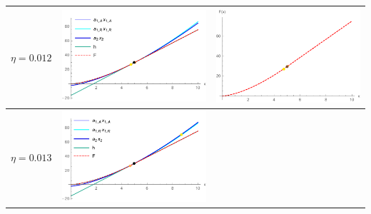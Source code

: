 \begin{table}[!htb]
\begin{tabular}{c|c|c}
		$\eta=0.012$ & 
		\begin{minipage}{.4\textwidth}
			\includegraphics[width=\linewidth]{Prob3/eta0121_1.pdf}
		\end{minipage}
		& \begin{minipage}{.4\textwidth}
			\includegraphics[width=\linewidth]{Prob3/eta012dash_1.pdf}
		\end{minipage}
		\\ \hline
		$\eta=0.013$ & \begin{minipage}{.4\textwidth}
			\includegraphics[width=\linewidth]{Prob3/eta013_1.pdf}

\end{minipage}
\end{tabular}
\end{table}
